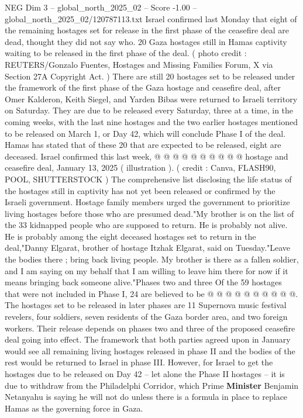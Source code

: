 \begin{textsample}{NEG Dim 3 – global\_north\_2025\_02 – Score -1.00 – global\_north\_2025\_02/120787113.txt}  \label{ex:f3_neg_165}
Israel confirmed last Monday that eight of the remaining hostages set for release in the first phase of the ceasefire deal are dead, thought they did not say who. 20 Gaza hostages still in Hamas captivity waiting to be released in the first phase of the deal. ( photo credit : REUTERS/Gonzalo Fuentes, Hostages and Missing Families Forum, X via Section 27A Copyright Act. ) There are still 20 hostages set to be released under the framework of the first phase of the Gaza hostage and ceasefire deal, after Omer Kalderon, Keith Siegel, and Yarden Bibas were returned to Israeli territory on Saturday.
They are due to be released every Saturday, three at a time, in the coming weeks, with the last nine hostages and the two earlier hostages mentioned to be released on March 1, or Day 42, which will conclude Phase I of the deal.
Hamas has stated that of these 20 that are expected to be released, eight are deceased.
Israel confirmed this last week, @ @ @ @ @ @ @ @ @ @ hostage and ceasefire deal, January 13, 2025 ( illustration ). ( credit : Canva, FLASH90, POOL, SHUTTERSTOCK ) The comprehensive list disclosing the life status of the hostages still in captivity has not yet been released or confirmed by the Israeli government.
Hostage family members urged the government to prioritize living hostages before those who are presumed dead."My brother is on the list of the 33 kidnapped people who are supposed to return.
He is probably not alive.
He is probably among the eight deceased hostages set to return in the deal,"Danny Elgarat, brother of hostage Itzhak Elgarat, said on Tuesday."Leave the bodies there ; bring back living people.
My brother is there as a fallen soldier, and I am saying on my behalf that I am willing to leave him there for now if it means bringing back someone alive."Phases two and three Of the 59 hostages that were not included in Phase I, 24 are believed to be @ @ @ @ @ @ @ @ @ @.
The hostages set to be released in later phases are 11 Supernova music festival revelers, four soldiers, seven residents of the Gaza border area, and two foreign workers.
Their release depends on phases two and three of the proposed ceasefire deal going into effect.
The framework that both parties agreed upon in January would see all remaining living hostages released in phase II and the bodies of the rest would be returned to Israel in phase III.
However, for Israel to get the hostages due to be released on Day 42 -- let alone the Phase II hostages -- it is due to withdraw from the Philadelphi Corridor, which Prime \textbf{Minister} Benjamin Netanyahu is saying he will not do unless there is a formula in place to replace Hamas as the governing force in Gaza.

\end{textsample}
